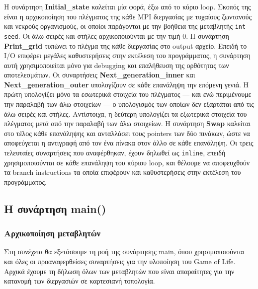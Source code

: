 \begin{multicols}{2}
Η συνάρτηση \textbf{Initial\_state} καλείται μία φορά, έξω από το κύριο loop. Σκοπός της είναι η αρχικοποίηση του πλέγματος της κάθε MPI διεργασίας με τυχαίους ζωντανούς και νεκρούς οργανισμούς, οι οποίοι παράγονται με την βοήθεια της μεταβλητής \texttt{int seed}. Οι άλω σειρές και στήλες αρχικοποιούνται με την τιμή 0. Η συνάρτηση \textbf{Print\_grid} τυπώνει το πλέγμα της κάθε διεργασίας στο output αρχείο. Επειδή το I/O επιφέρει μεγάλες καθυστερήσεις στην εκτέλεση του προγράμματος, η συνάρτηση αυτή χρησιμοποιείται μόνο για debugging και επαλήθευση της ορθότητας των αποτελεσμάτων. Οι συναρτήσεις \textbf{Next\_generation\_inner} και \textbf{Next\_generation\_outer } υπολογίζουν σε κάθε επανάληψη την επόμενη γενιά. Η πρώτη υπολογίζει μόνο τα εσωτερικά στοιχεία του πλέγματος --- και ενώ περιμένουμε την παραλαβή των άλω στοιχείων --- ο υπολογισμός των οποίων δεν εξαρτάται από τις άλω σειρές και στήλες. Αντίστοιχα, η δεύτερη υπολογίζει τα εξωτερικά στοιχεία του πλέγματος μετά από την παραλαβή των άλω στοιχείων. Η συνάρτηση \textbf{Swap} καλείται στο τέλος κάθε επανάληψης και ανταλλάσει τους pointers των δύο πινάκων, ώστε να αποφεύγεται η αντιγραφή από τον ένα πίνακα στον άλλο σε κάθε επανάληψη. Οι τρεις τελευταίες συναρτήσεις που αναφέρθηκαν, έχουν δηλωθεί ως \texttt{inline}, επειδή χρησιμοποιούνται σε κάθε επανάληψη του κύριου loop, και θέλουμε να αποφευχθούν τα branch instructions τα οποία επιφέρουν και καθυστερήσεις στην εκτέλεση του προγράμματος.
\end{multicols}

\clearpage

\subsection{Η συνάρτηση main()}
\subsubsection{Αρχικοποίηση μεταβλητών}
Στη συνέχεια θα εξετάσουμε τη ροή της συνάρτησης main, όπου χρησιμοποιούνται και όλες οι προαναφερθείσες συναρτήσεις για την υλοποίηση του Game of Life. Αρχικά έχουμε τη δήλωση όλων των μεταβλητών που είναι απαραίτητες για την κατανομή των διεργασιών σε καρτεσιανή τοπολογία.

